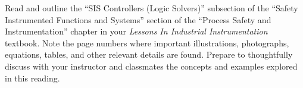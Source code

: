 

Read and outline the ``SIS Controllers (Logic Solvers)'' subsection of the ``Safety Instrumented Functions and Systems'' section of the ``Process Safety and Instrumentation'' chapter in your {\it Lessons In Industrial Instrumentation} textbook.  Note the page numbers where important illustrations, photographs, equations, tables, and other relevant details are found.  Prepare to thoughtfully discuss with your instructor and classmates the concepts and examples explored in this reading.

















